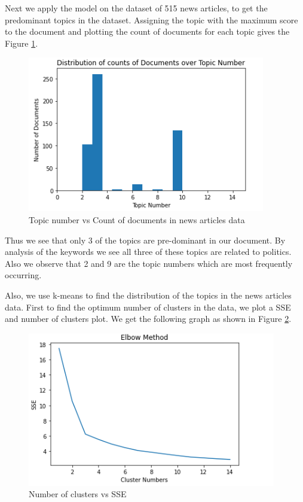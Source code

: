\documentclass{article}
\begin{document}
Next we apply the model on the dataset of 515 news articles, to get the predominant topics in the dataset. Assigning the topic with the maximum score to the document and plotting the count of documents for each topic gives the Figure \ref{Topic number vs Count of documents in news articles data}.

\begin{figure}
    \centering
    \includegraphics[scale=1]{dist.PNG}
    \caption{Topic number vs Count of documents in news articles data}
    \label{Topic number vs Count of documents in news articles data}
\end{figure}

Thus we see that only 3 of the topics are pre-dominant in our document. By analysis of the keywords we see all three of these topics are related to politics. Also we observe that 2 and 9 are the topic numbers which are most  frequently occurring. 

Also, we use k-means to find the distribution of the topics in the news articles data. First to find the optimum number of clusters in the data, we plot a SSE and number of clusters plot. We get the following graph as shown in Figure \ref{Number of clusters vs SSE}.
\begin{figure}
    \centering
    \includegraphics[scale=1]{sse.PNG}
    \caption{Number of clusters vs SSE}
    \label{Number of clusters vs SSE}
\end{figure}
\end{document}
